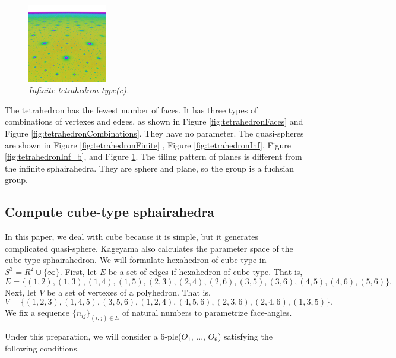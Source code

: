 \documentclass[suppldata, dvipdfmx]{interact}
\theoremstyle{plain}%
\theoremstyle{definition}
\theoremstyle{remark}
\theoremstyle{problemstyle}
\begin{document}
\begin{figure}[H]
\begin{minipage}{0.5\textwidth}
  \begin{minipage}[t]{0.24\textwidth}
   \centering
   \includegraphics[width=1.35in, height=1.35in, keepaspectratio]{./img/sphairahedron/tetrahedron/limitset_c.png}
  \end{minipage}
  \hspace*{\fill}
  \caption{\textit{Infinite tetrahedron type(c).}}
  \label{fig:tetrahedronInf_c}
 \end{minipage}
\end{figure}

The tetrahedron has the fewest number of faces.
It has three types of combinations of vertexes and edges, as shown in
Figure \ref{fig:tetrahedronFaces} and Figure \ref{fig:tetrahedronCombinations}.
They have no parameter.
The quasi-spheres are shown in Figure \ref{fig:tetrahedronFinite}
, Figure \ref{fig:tetrahedronInf}, Figure \ref{fig:tetrahedronInf_b},
and Figure \ref{fig:tetrahedronInf_c}.
The tiling pattern of planes is different from the infinite sphairahedra.
They are sphere and plane, so the group is a fuchsian group.



\subsection{Compute cube-type sphairahedra}
In this paper, we deal with cube because it is simple, but it generates
complicated quasi-sphere.
Kageyama also calculates the parameter space of the cube-type
sphairahedron\cite{kageyama}.
We will formulate hexahedron of cube-type in $S^3 = R^2 \cup \{\infty\}$.
First, let $E$ be a set of edges if hexahedron of cube-type. That is,
$$
E = \{(1, 2), (1, 3), (1, 4), (1, 5), (2, 3), (2, 4), (2, 6), (3, 5),
(3, 6), (4, 5), (4, 6), (5, 6)\}.
$$
Next, let $V$ be a set of vertexes of a polyhedron. That is,
$$
V = \{(1, 2, 3), (1, 4, 5), (3, 5, 6), (1, 2, 4), (4, 5, 6), (2, 3, 6),
(2, 4, 6), (1, 3, 5)\}.
$$
We fix a sequence $\{n_{ij}\}_{(i,j) \in E}$ of natural numbers to
parametrize face-angles.

Under this preparation, we will consider a 6-ple($O_1$, ..., $O_6$)
satisfying the following conditions.
\end{document}
